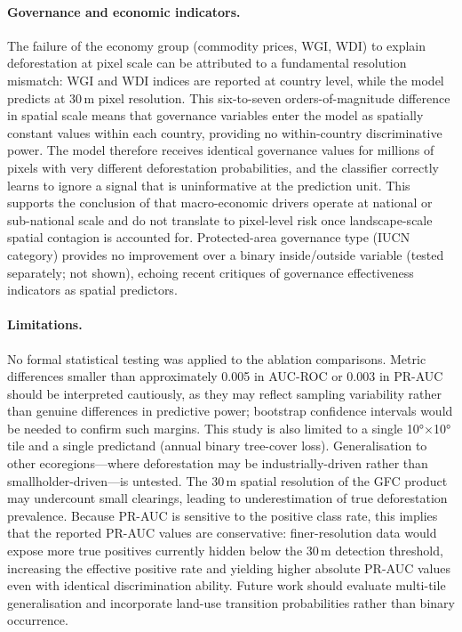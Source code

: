 \documentclass{iopart}
\begin{document}
\paragraph{Governance and economic indicators.}
The failure of the economy group (commodity prices, WGI, WDI) to
explain deforestation at pixel scale can be attributed to a fundamental
resolution mismatch: WGI and WDI indices are reported at country level,
while the model predicts at 30\,m pixel resolution.
This six-to-seven orders-of-magnitude difference in spatial scale means
that governance variables enter the model as spatially constant
values within each country, providing no within-country discriminative
power.
The model therefore receives identical governance values for millions
of pixels with very different deforestation probabilities, and the
classifier correctly learns to ignore a signal that is uninformative
at the prediction unit.
This supports the conclusion of \cite{Busch2017} that macro-economic
drivers operate at national or sub-national scale and do not translate
to pixel-level risk once landscape-scale spatial contagion is accounted for.
Protected-area governance type (IUCN category) provides no improvement
over a binary inside/outside variable (tested separately; not shown),
echoing recent critiques of governance effectiveness indicators as
spatial predictors.

\paragraph{Limitations.}
No formal statistical testing was applied to the ablation comparisons.
Metric differences smaller than approximately 0.005 in AUC-ROC or
0.003 in PR-AUC should be interpreted cautiously, as they may reflect
sampling variability rather than genuine differences in predictive power;
bootstrap confidence intervals would be needed to confirm such margins.
This study is also limited to a single 10°$\times$10° tile and a single
predictand (annual binary tree-cover loss).
Generalisation to other ecoregions---where deforestation may be
industrially-driven rather than smallholder-driven---is untested.
The 30\,m spatial resolution of the GFC product may undercount small
clearings, leading to underestimation of true deforestation prevalence.
Because PR-AUC is sensitive to the positive class rate, this implies
that the reported PR-AUC values are conservative: finer-resolution
data would expose more true positives currently hidden below the 30\,m
detection threshold, increasing the effective positive rate and
yielding higher absolute PR-AUC values even with identical
discrimination ability.
Future work should evaluate multi-tile generalisation and incorporate
land-use transition probabilities rather than binary occurrence.
\end{document}

